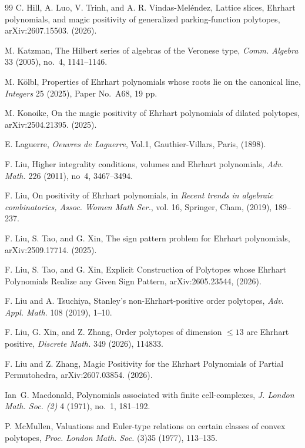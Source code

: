 \documentclass[reqno, 12pt]{article}
\numberwithin{equation}{section}
\theoremstyle{definition}
\begin{document}
\begin{thebibliography}{99}
 C. Hill, A. Luo, V. Trinh, and A. R. Vindas-Mel\'endez, Lattice slices, Ehrhart polynomials, and magic positivity of generalized parking-function polytopes, arXiv:2607.15503. (2026).

 M. Katzman, The Hilbert series of algebras of the Veronese type, \emph{Comm. Algebra} 33 (2005), no.~4, 1141--1146.

 M. K{\"o}lbl, Properties of Ehrhart polynomials whose roots lie on the canonical line, \emph{Integers} 25 (2025), Paper No.~A68, 19 pp.

 M. Konoike, On the magic positivity of Ehrhart polynomials of dilated polytopes, arXiv:2504.21395. (2025).

 E. Laguerre, \emph{Oeuvres de Laguerre}, Vol.1, Gauthier-Villars, Paris, (1898).

 F. Liu, Higher integrality conditions, volumes and Ehrhart polynomials, \emph{Adv. Math.} 226 (2011), no~4,  3467--3494.

 F. Liu, On positivity of Ehrhart polynomials, in \emph{Recent trends in algebraic combinatorics, Assoc. Women Math Ser.}, vol. 16, Springer, Cham, (2019), 189--237.

 F. Liu, S. Tao, and G. Xin, The sign pattern problem for Ehrhart polynomials, arXiv:2509.17714. (2025).

 F. Liu, S. Tao, and G. Xin, Explicit Construction of Polytopes whose Ehrhart Polynomials Realize any Given Sign Pattern, arXiv:2605.23544, (2026).

 F. Liu and A. Tsuchiya, Stanley's non-Ehrhart-positive order polytopes, \emph{Adv. Appl. Math.} 108 (2019), 1--10.

 F. Liu, G. Xin, and Z. Zhang, Order polytopes of dimension $\leq 13$ are Ehrhart positive, \emph{Discrete Math.} 349 (2026), 114833.

 F. Liu and Z. Zhang, Magic Positivity for the Ehrhart Polynomials of Partial Permutohedra, arXiv:2607.03854. (2026).

 Ian~G. Macdonald, Polynomials associated with finite cell-complexes, \emph{J. London Math. Soc. (2)} 4 (1971), no.~1, 181--192.

 P. McMullen, Valuations and Euler-type relations on certain classes of convex polytopes, \emph{Proc. London Math. Soc.} (3)35 (1977), 113--135.


\end{thebibliography}
\end{document}
